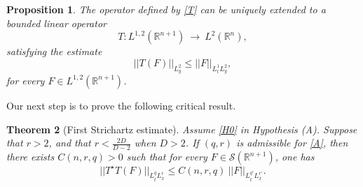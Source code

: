 \documentclass[11pt,letter]{amsart}
\def \R {\mathbb{R}}
\newcommand{\Rn}{\mathbb R^n}
\numberwithin{equation}{section}
\newtheorem{theorem}{Theorem}[section]
\newtheorem{proposition}[theorem]{Proposition}
\numberwithin{equation}{section}
\begin{document}
\begin{proposition}\label{P:T}
The operator defined by \eqref{T} can be uniquely extended to a bounded linear operator 
\[
T: L^{1,2}(\R^{n+1})\ \longrightarrow\ L^2(\Rn),
\]
satisfying the estimate
\begin{equation}\label{Tuno}
||T(F)||_{L^2_y} \le ||F||_{L^1_t L^2_y},
\end{equation}
for every $F\in L^{1,2}(\R^{n+1})$.
\end{proposition}

Our next step is to prove the following critical result.

\begin{theorem}[First Strichartz estimate]\label{T:SEA} 
Assume \eqref{H0} in \emph{Hypothesis (A)}. Suppose that $r>2$, and that $r < \frac{2D}{D-2}$ when $D> 2$. If $(q,r)$ is admissible for \eqref{A}, then there exists $C(n,r,q)>0$ such that for every $F\in \mathscr S(\R^{n+1})$, one has  
\begin{equation}\label{gettingthereA}
||T^\star T(F)||_{L^q_tL^r_x} \le C(n,r,q)\ ||F||_{L^{q'}_tL^{r'}_x}.
\end{equation}
\end{theorem}
\end{document}
